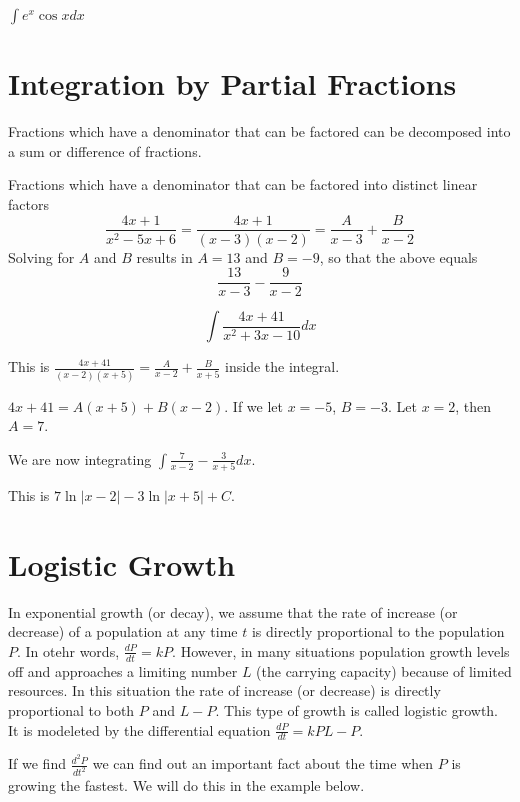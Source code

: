 \documentclass[../bccalc.tex]{subfiles}
\begin{document}
\ex $\int e^x \cos x dx$
\section{Integration by Partial Fractions}
Fractions which have a denominator that can be factored can be decomposed into a sum or difference of fractions.

Fractions which have a denominator that can be factored into distinct linear factors 
\[ \frac{4x+1}{x^2-5x+6}=\frac{4x+1}{(x-3)(x-2)}=\frac{A}{x-3}+\frac{B}{x-2} \]
Solving for $A$ and $B$ results in $A=13$ and $B=-9$, so that the above equals 
\[ \frac{13}{x-3}-\frac{9}{x-2} \]

\begin{example}
    \[ \int \frac{4x+41}{x^2+3x-10}dx \]

    This is $\frac{4x+41}{(x-2)(x+5)}=\frac{A}{x-2}+\frac{B}{x+5}$ inside the integral.

    $4x+41=A(x+5)+B(x-2)$. If we let $x=-5$, $B=-3$. Let $x=2$, then $A=7$.

    We are now integrating $\int \frac{7}{x-2}-\frac{3}{x+5}dx$.

    This is $7\ln |x-2|-3\ln |x+5|+C$.
\end{example} 

\section{Logistic Growth}
In exponential growth (or decay), we assume that the rate of increase (or decrease) of a population at any time $t$ is directly proportional to the population $P$. In otehr words, $\frac{dP}{dt}=kP$. However, in many situations population growth levels off and approaches a limiting number $L$ (the carrying capacity) because of limited resources.
In this situation the rate of increase (or decrease) is directly proportional to both $P$ and $L-P$. This type of growth is called logistic growth. It is modeleted by the differential equation $\frac{dP}{dt}=kP{L-P}$.

If we find $\frac{d^2P}{dt^2}$ we can find out an important fact about the time when $P$ is growing the fastest. We will do this in the example below.
\end{document}
